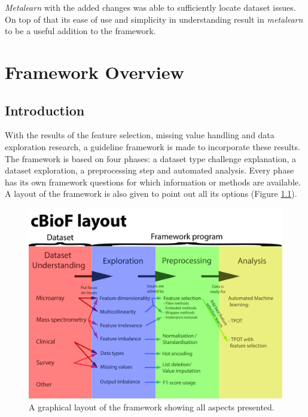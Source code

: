 \documentclass[10pt,a4paper]{report}
\begin{document}
	\textit{Metalearn} with the added changes was able to sufficiently locate dataset issues. On top of that its ease of use and simplicity in understanding result in \textit{metalearn} to be a useful addition to the framework.
	
	\chapter{Framework Overview}
	\label{chap:FrameworkImplementation}
	
	\section{Introduction}
	\label{FIsec:Introduction}
	
	With the results of the feature selection, missing value handling and data exploration research, a guideline framework is made to incorporate these results. The framework is based on four phases: a dataset type challenge explanation, a dataset exploration, a preprocessing step and automated analysis. Every phase has its own framework questions for which information or methods are available. A layout of the framework is also given to point out all its options (Figure \ref{fig:FrameworkLayout}).
	
	\begin{figure}
		\includegraphics[width=\linewidth]{FrameworkLayout.jpg}
		\caption{A graphical layout of the framework showing all aspects presented.}\label{fig:FrameworkLayout}
	\end{figure}
	
\end{document}
